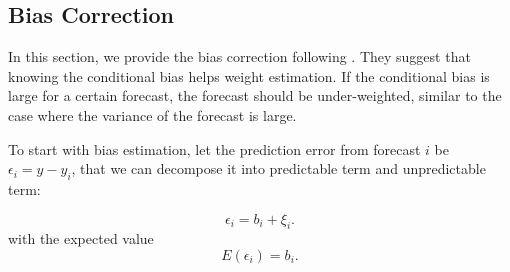 \documentclass[11pt]{article}
\begin{document}

\subsection{Bias Correction}\label{bias-correction}
In this section, we provide the bias correction following \cite{Gibbs2017}. They suggest that knowing the conditional bias helps weight estimation. If the conditional bias is large for a certain forecast, the forecast should be under-weighted, similar to the case where the variance of the forecast is large.

To start with bias estimation, let the prediction error from forecast \(i\) be \(\epsilon_i = y - y_i\), that we can decompose it into predictable term and unpredictable term:

\begin{equation}
\label{eqn: w bias assumption}
\epsilon_i = b_i + \xi_i. 
\end{equation}
with the expected value
\begin{equation}
\label{eqn: bias estimate}
E(\epsilon_i) = b_i.
\end{equation}
\end{document}
